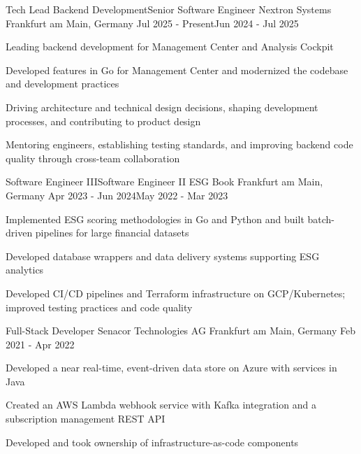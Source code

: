 \begin{cventries}

  \cventry
    {Tech Lead Backend Development\newline Senior Software Engineer}
    {Nextron Systems}
    {Frankfurt am Main, Germany}
    {Jul 2025 - Present\newline Jun 2024 - Jul 2025}
    {
      \begin{cvitems}
        \item {Leading backend development for Management Center and Analysis Cockpit}
        \item {Developed features in Go for Management Center and modernized the codebase and development practices}
        \item {Driving architecture and technical design decisions, shaping development processes, and contributing to product design}
        \item {Mentoring engineers, establishing testing standards, and improving backend code quality through cross-team collaboration}
      \end{cvitems}
    }

  \cventry
    {Software Engineer III\newline Software Engineer II}
    {ESG Book}
    {Frankfurt am Main, Germany}
    {Apr 2023 - Jun 2024\newline May 2022 - Mar 2023}
    {
      \begin{cvitems}
        \item {Implemented ESG scoring methodologies in Go and Python and built batch-driven pipelines for large financial datasets}
        \item {Developed database wrappers and data delivery systems supporting ESG analytics}
        \item {Developed CI/CD pipelines and Terraform infrastructure on GCP/Kubernetes; improved testing practices and code quality}
      \end{cvitems}
    }

  \cventry
    {Full-Stack Developer}
    {Senacor Technologies AG}
    {Frankfurt am Main, Germany}
    {Feb 2021 - Apr 2022}
    {
      \begin{cvitems}
        \item {Developed a near real-time, event-driven data store on Azure with services in Java}
        \item {Created an AWS Lambda webhook service with Kafka integration and a subscription management REST API}
        \item {Developed and took ownership of infrastructure-as-code components}
      \end{cvitems}
    }


\end{cventries}
